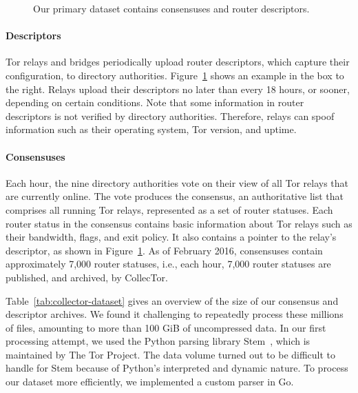 \begin{figure}[t]
\caption{Our primary dataset contains consensuses and router descriptors.}
\label{fig:datasets}
\end{figure}

\paragraph{Descriptors} Tor relays and bridges periodically upload router
descriptors, which capture their configuration, to directory authorities.
Figure~\ref{fig:datasets} shows an example in the box to the right.  Relays
upload their descriptors no later than every 18 hours, or sooner, depending on
certain conditions.  Note that some information in router descriptors is not
verified by directory authorities.  Therefore, relays can spoof information such
as their operating system, Tor version, and uptime.

\paragraph{Consensuses} Each hour, the nine directory authorities vote on their
view of all Tor relays that are currently online.  The vote produces the
consensus, an authoritative list that comprises all running Tor relays,
represented as a set of router statuses.  Each router status in the consensus
contains basic information about Tor relays such as their bandwidth, flags, and
exit policy.  It also contains a pointer to the relay's descriptor, as shown in
Figure~\ref{fig:datasets}.  As of February 2016, consensuses contain
approximately 7,000 router statuses, i.e., each hour, 7,000 router statuses are
published, and archived, by CollecTor.

Table~\ref{tab:collector-dataset} gives an overview of the size of our consensus
and descriptor archives.  We found it challenging to repeatedly process these
millions of files, amounting to more than 100 GiB of uncompressed data.  In our
first processing attempt, we used the Python parsing library Stem~\cite{stem},
which is maintained by The Tor Project.  The data volume turned out to be
difficult to handle for Stem because of Python's interpreted and dynamic nature.
To process our dataset more efficiently, we implemented a custom parser in Go.

